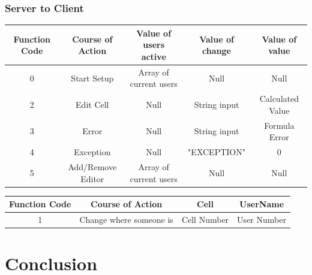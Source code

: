 \documentclass[titlepage]{article}
\begin{document}
    \subsubsection{Server to Client}
        \begin{center}
            \begin{tabular}{| c | c | c | c | c |}
                \hline 
                Function Code & Course of Action & Value of users active & Value of change & Value of value\\ \hline
                0 & Start Setup & Array of current users & Null & Null \\
                2 & Edit Cell & Null  & String input & Calculated Value \\
                3 & Error & Null & String input & Formula Error \\
                4 & Exception & Null & "EXCEPTION" & 0 \\
                5 & Add/Remove Editor  & Array of current users & Null & Null \\
                \hline            
            \end{tabular}
        \end{center}
        \begin{center}
            \begin{tabular}{| c | c | c | c |}
                \hline 
                Function Code & Course of Action & Cell  & UserName \\ \hline
                1 & Change where someone is & Cell Number & User Number \\
                \hline            
            \end{tabular}    
        \end{center}
        
\section{Conclusion}
\end{document}
